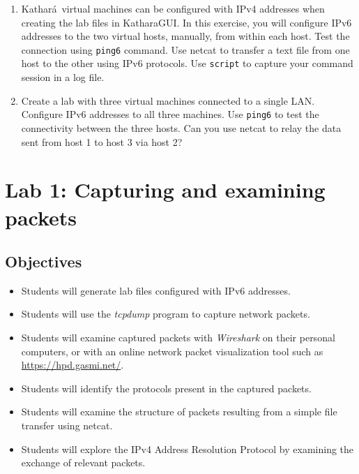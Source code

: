\documentclass[12pt]{book}
\newcommand{\kathara}{Kathar\'a}
\begin{document}
\begin{enumerate}[1.]
\item\label{ipv6.ex} \kathara\ virtual machines can be configured with
  IPv4 addresses 
  when creating the lab files in KatharaGUI. In this exercise, you
  will configure IPv6 addresses to the two virtual hosts, manually,
  from within each host. Test the connection using \verb$ping6$
  command. Use netcat to transfer a text file from one host to the
  other using IPv6 protocols. Use \verb$script$ to capture your
  command session in a log file.

\item Create a lab with three virtual machines connected to a single
  LAN. Configure IPv6 addresses to all three machines. Use
  \verb$ping6$ to test the connectivity between the three hosts. Can
  you use netcat to relay the data sent from host 1 to host 3 via host
  2?
\end{enumerate}



\chapter{Lab 1: Capturing and examining packets }\label{tcpdump.se}

\section{Objectives}

\begin{itemize}[--]
  \item Students will generate lab files configured with IPv6
    addresses. 
\item Students will use the \emph{tcpdump} program to capture network
  packets. 
\item Students will examine captured packets with
  \emph{Wireshark} on their personal computers, or with an online
  network packet visualization tool such as
  \url{https://hpd.gasmi.net/}. 
\item Students will identify the protocols
  present in the captured packets. 
\item Students will examine the structure of packets resulting from a
  simple file transfer using netcat. 
\item Students will explore the 
  IPv4 Address Resolution Protocol by examining the exchange of relevant
  packets. 

\end{itemize}
\end{document}
